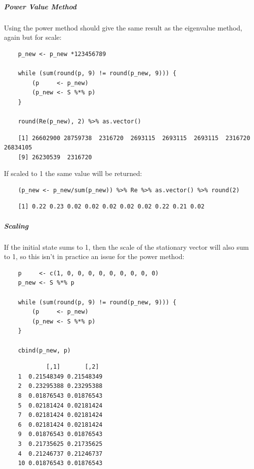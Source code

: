 \documentclass[11pt]{report}
\begin{document}
\subparagraph{Power Value Method}
\label{power-value-method}
Using the power method should give the same result as the eigenvalue method, again but for scale:

\begin{tcolorbox}
    \begin{verbatim}
    p_new <- p_new *123456789

    while (sum(round(p, 9) != round(p_new, 9))) {
        (p     <- p_new)
        (p_new <- S %*% p)
    }

    round(Re(p_new), 2) %>% as.vector()
    \end{verbatim}
\tcblower
    \begin{verbatim}
    [1] 26602900 28759738  2316720  2693115  2693115  2693115  2316720 26834105
    [9] 26230539  2316720
    \end{verbatim}
\end{tcolorbox}

If scaled to 1 the
same value will be returned:

\begin{tcolorbox}
    \begin{verbatim}
    (p_new <- p_new/sum(p_new)) %>% Re %>% as.vector() %>% round(2)
    \end{verbatim}
\tcblower
    \begin{verbatim}
    [1] 0.22 0.23 0.02 0.02 0.02 0.02 0.02 0.22 0.21 0.02
    \end{verbatim}
\end{tcolorbox}
\subparagraph{Scaling}
\label{scaling}
If the initial state sums to 1, then the scale of the stationary
vector will also sum to 1, so this isn't in practice an issue for the power method:

\begin{tcolorbox}
    \begin{verbatim}
    p     <- c(1, 0, 0, 0, 0, 0, 0, 0, 0, 0)
    p_new <- S %*% p

    while (sum(round(p, 9) != round(p_new, 9))) {
        (p     <- p_new)
        (p_new <- S %*% p)
    }

    cbind(p_new, p)
    \end{verbatim}
\tcblower
    \begin{verbatim}
            [,1]       [,2]
    1  0.21548349 0.21548349
    2  0.23295388 0.23295388
    8  0.01876543 0.01876543
    5  0.02181424 0.02181424
    7  0.02181424 0.02181424
    6  0.02181424 0.02181424
    9  0.01876543 0.01876543
    3  0.21735625 0.21735625
    4  0.21246737 0.21246737
    10 0.01876543 0.01876543
    \end{verbatim}
\end{tcolorbox}
\end{document}
